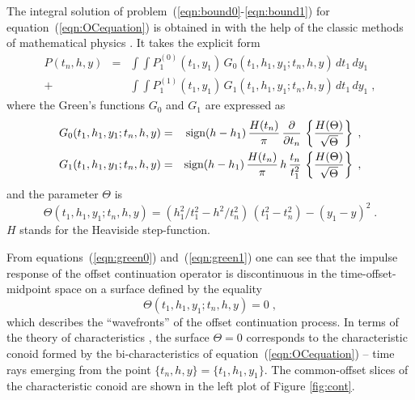 The integral solution of problem~(\ref{eqn:bound0}-\ref{eqn:bound1})
for equation~(\ref{eqn:OCequation}) is obtained in with the help of
the classic methods of mathematical physics
\cite[]{me,Fomel.sepphd.107}. It takes the explicit form
\begin{eqnarray}
P(t_n,h,y) & = &
\int\!\!\int P^{(0)}_1(t_1,y_1)\,G_0(t_1,h_1,y_1;t_n,h,y)\,dt_1\,dy_1
\nonumber \\ 
+ & & 
\int\!\!\int P^{(1)}_1(t_1,y_1)\,G_1(t_1,h_1,y_1;t_n,h,y)\,dt_1\,dy_1\;,
\label{eqn:integral} 
\end{eqnarray}
where the Green's functions $G_0$ and $G_1$ are expressed as
\begin{eqnarray}
G_0(t_1,h_1,y_1;t_n,h,y) & = & \mbox{sign}(h-h_1)\,{H(t_n) \over \pi}\,
{\partial \over \partial t_n}\,\left\{
H(\Theta) \over 
\sqrt{\Theta}\right\}\;,
\label{eqn:green0} \\
G_1(t_1,h_1,y_1;t_n,h,y) & = & \mbox{sign}(h-h_1)\,
{H(t_n) \over \pi}\,h\,
{t_n \over t_1^2}\,\left\{
H(\Theta) \over 
\sqrt{\Theta}\right\}\;,
\label{eqn:green1} 
\end{eqnarray}
and the parameter $\Theta$ is
\begin{equation}
\Theta(t_1,h_1,y_1;t_n,h,y)  = 
\left(h_1^2/t_1^2-h^2/t_n^2\right)\,\left(t_1^2-t_n^2\right)-
\left(y_1-y\right)^2\;.
\label{eqn:gamma}
\end{equation}
$H$ stands for the Heaviside step-function. 
 
From equations~(\ref{eqn:green0}) and~(\ref{eqn:green1}) one can see
that the impulse response of the offset continuation operator is
discontinuous in the time-offset-midpoint space on a surface defined
by the equality
\begin{equation}
\Theta(t_1,h_1,y_1;t_n,h,y)  = 0\;,
\label{eqn:conoid}
\end{equation}
which describes the ``wavefronts'' of the offset continuation process.
In terms of the theory of characteristics \cite[]{kurant}, the surface
$\Theta=0$ corresponds to the characteristic conoid formed by the
bi-characteristics of equation~(\ref{eqn:OCequation}) -- time rays
emerging from the point $\{t_n,h,y\}=\{t_1,h_1,y_1\}$. The
common-offset slices of the characteristic conoid are shown in the
left plot of Figure \ref{fig:cont}.


